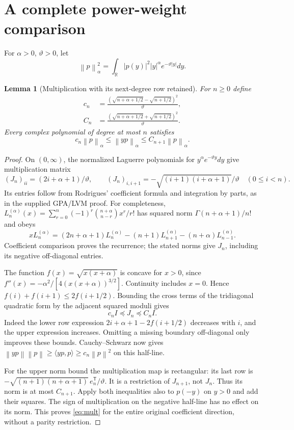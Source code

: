 \documentclass[11pt,a4paper]{article}
\newtheorem{lemma}[theorem]{Lemma}
\newcommand{\R}{\mathbb R}
\newcommand{\norm}[1]{\left\lVert#1\right\rVert}
\begin{document}
\section{A complete power-weight comparison}
For $\alpha>0$, $\vartheta>0$, let
\[
 \norm{p}_\alpha^2=\int_{\R}|p(y)|^2|y|^\alpha e^{-\vartheta|y|}dy.
\]
\begin{lemma}[Multiplication with its next-degree row retained]\label{lem:mult}
For $n\ge0$ define
\begin{equation}
\begin{split}
 c_n&=\frac{(\sqrt{n+\alpha+1/2}-\sqrt{n+1/2})^2}{\vartheta},\\
 C_n&=\frac{(\sqrt{n+\alpha+1/2}+\sqrt{n+1/2})^2}{\vartheta}.
\end{split}\label{eq:cn}
\end{equation}
Every complex polynomial of degree at most $n$ satisfies
\begin{equation}
 c_n\norm{p}_\alpha\le\norm{yp}_\alpha\le C_{n+1}\norm{p}_\alpha.
 \label{eq:mult}
\end{equation}
\end{lemma}
\begin{proof}
On $(0,\infty)$, the normalized Laguerre polynomials for $y^\alpha e^{-\vartheta y}dy$ give multiplication matrix
\[
 (J_n)_{ii}=(2i+\alpha+1)/\vartheta,\qquad
 (J_n)_{i,i+1}=-\sqrt{(i+1)(i+\alpha+1)}/\vartheta
 \quad(0\le i<n).
\]
Its entries follow from Rodrigues' coefficient formula and integration by parts, as in the supplied GPA/LVM proof. For completeness, $L_n^{(\alpha)}(x)=\sum_{r=0}^n(-1)^r\binom{n+\alpha}{n-r}x^r/r!$ has squared norm $\Gamma(n+\alpha+1)/n!$ and obeys
\[
 xL_n^{(\alpha)}=(2n+\alpha+1)L_n^{(\alpha)}
 -(n+1)L_{n+1}^{(\alpha)}-(n+\alpha)L_{n-1}^{(\alpha)}.
\]
Coefficient comparison proves the recurrence; the stated norms give $J_n$, including its negative off-diagonal entries.

The function $f(x)=\sqrt{x(x+\alpha)}$ is concave for $x>0$, since $f''(x)=-\alpha^2/[4(x(x+\alpha))^{3/2}]$. Continuity includes $x=0$. Hence $f(i)+f(i+1)\le2f(i+1/2)$. Bounding the cross terms of the tridiagonal quadratic form by the adjacent squared moduli gives
\[
 c_n I\preceq J_n\preceq C_n I.
\]
Indeed the lower row expression $2i+\alpha+1-2f(i+1/2)$ decreases with $i$, and the upper expression increases. Omitting a missing boundary off-diagonal only improves these bounds. Cauchy--Schwarz now gives $\norm{yp}\norm p\ge\langle yp,p\rangle\ge c_n\norm p^2$ on this half-line.

For the upper norm bound the multiplication map is rectangular: its last row is $-\sqrt{(n+1)(n+\alpha+1)}\,e_n^{\mathsf T}/\vartheta$. It is a restriction of $J_{n+1}$, not $J_n$. Thus its norm is at most $C_{n+1}$. Apply both inequalities also to $p(-y)$ on $y>0$ and add their squares. The sign of multiplication on the negative half-line has no effect on its norm. This proves \eqref{eq:mult} for the entire original coefficient direction, without a parity restriction.
\end{proof}
\end{document}
